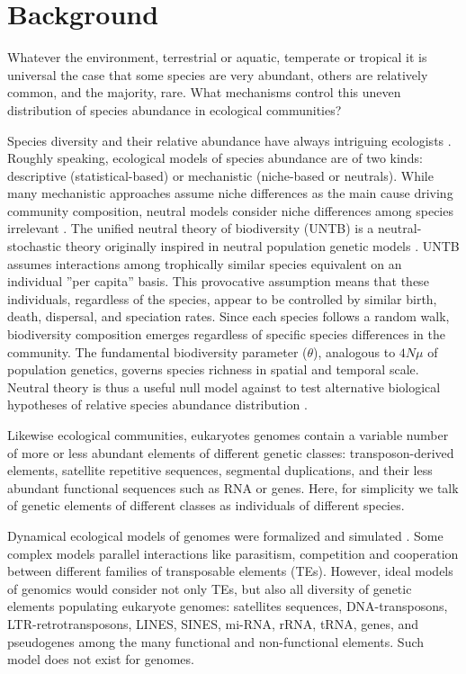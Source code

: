
\section{Background}

Whatever the environment, terrestrial or aquatic, temperate or tropical it is universal the case that some species are very abundant, others are relatively common, and the majority, rare. What mechanisms control this uneven distribution of species abundance in ecological communities?

Species diversity and their relative abundance have always intriguing ecologists \cite{McGill2007}. Roughly speaking, ecological models of species abundance are of two kinds: descriptive (statistical-based) or mechanistic (niche-based or neutrals). While many mechanistic approaches assume niche differences as the main cause driving community composition, neutral models consider niche differences among species irrelevant \cite{Margurran2004}. The unified neutral theory of biodiversity (UNTB) \cite{Hubbell2001,Rosindell2011} is a neutral-stochastic theory originally inspired in neutral population genetic models \cite{Kimura1985,Wright1931}. UNTB assumes interactions among trophically similar species equivalent on an individual ''per capita'' basis. This provocative assumption means that these individuals, regardless of the species, appear to be controlled by similar birth, death, dispersal, and speciation rates. Since each species follows a random walk, biodiversity composition emerges regardless of specific species differences in the community. The fundamental biodiversity parameter ($\theta$), analogous to $4N\mu$­ of population genetics, governs species richness in spatial and temporal scale. Neutral theory is thus a useful null model against to test alternative biological hypotheses of relative species abundance distribution \cite{Volkov2003,Alonso2006}.

Likewise ecological communities, eukaryotes genomes contain a variable number of more or less abundant elements of different genetic classes: transposon-derived elements, satellite repetitive sequences, segmental duplications, and their less abundant functional sequences such as RNA or genes. Here, for simplicity we talk of genetic elements of different classes as individuals of different species.

Dynamical ecological models of genomes were formalized and simulated \cite{Abrusan2006,Leonardo2002,LeRouzic2007}. Some complex models parallel interactions like parasitism, competition and cooperation between different families of transposable elements (TEs). However, ideal models of genomics would consider not only TEs, but also all diversity of genetic elements populating eukaryote genomes: satellites sequences, DNA-transposons, LTR-retrotransposons, LINES, SINES, mi-RNA, rRNA, tRNA, genes, and pseudogenes among the many functional and non-functional elements. Such model does not exist for genomes.


